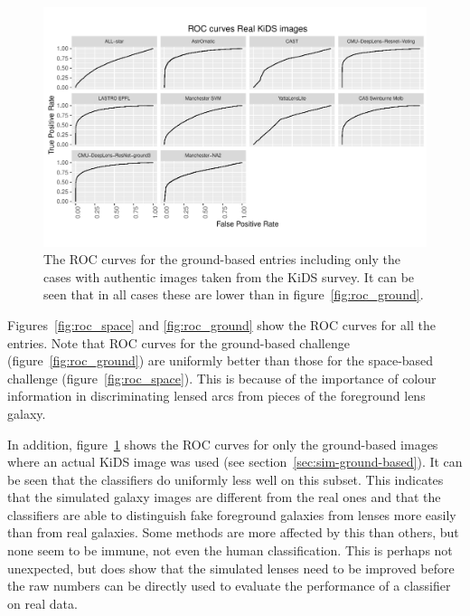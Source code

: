 \documentclass{aa}
\begin{document}
\begin{figure}
 \includegraphics[width=2\columnwidth]{figures/roc_kids.pdf}
 \caption{The ROC curves for the ground-based entries including only the cases with authentic images taken from the KiDS survey.  It can be seen that in all cases these are lower than in figure~\ref{fig:roc_ground}.}
 \label{fig:roc_kids}
\end{figure}

Figures~\ref{fig:roc_space} and \ref{fig:roc_ground} show the ROC curves for all the entries.  
Note that ROC curves for the ground-based challenge (figure~\ref{fig:roc_ground}) are uniformly better than those for the space-based challenge (figure~\ref{fig:roc_space}).  This is because of the importance of colour information in discriminating lensed arcs from pieces of the foreground lens galaxy.

In addition, figure~\ref{fig:roc_kids} shows the ROC curves for only the ground-based images where an actual KiDS image was used (see section~\ref{sec:sim-ground-based}).  It can be seen that the classifiers do uniformly less well on this subset.  This indicates that the simulated galaxy images are different from the real ones and that the classifiers are able to distinguish fake foreground galaxies from lenses more easily than from real galaxies.  Some methods are more affected by this than others, but none seem to be immune, not even the human classification. This is perhaps not unexpected, but does show that the simulated lenses need to be improved before the raw numbers can be directly used to evaluate the performance of a classifier on real data.
\end{document}
